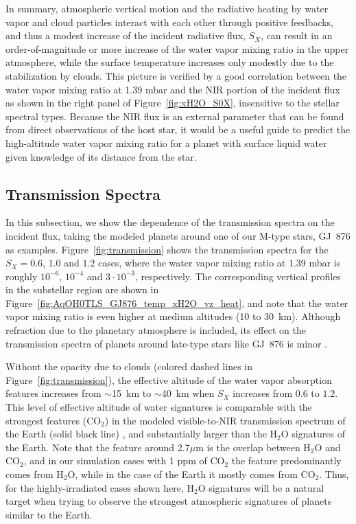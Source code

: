 \documentclass[11pt,numberedappendix,twocolappendix,]{emulateapj}
\def\water{H$_2$O}
\def\preslevel{1.39 mbar}
\def\wv{water vapor}
\begin{document}
In summary, atmospheric vertical motion and the radiative heating by \wv{} and cloud particles interact with each other through positive feedbacks, and thus a modest increase of the incident radiative flux, $S_X$, can result in  an order-of-magnitude or more increase of the \wv{} mixing ratio in the upper atmosphere, while the surface temperature increases only modestly due to the stabilization by clouds. 
This picture is verified by a good correlation between the \wv{} mixing ratio at \preslevel{} and the NIR portion of the incident flux as shown in the right panel of Figure~\ref{fig:xH2O_S0X}, insensitive to the stellar spectral types. %
Because the NIR flux is an external parameter that can be found from direct observations of the host star, it would be a useful guide to predict the high-altitude \wv{}  mixing ratio for a planet with surface liquid water given knowledge of its distance from the star. 


\subsection{Transmission Spectra}
\label{ss:result_TransmissionSpectra}


In this subsection, we show the dependence of the transmission spectra on the incident flux, taking the modeled planets around one of our M-type stars, GJ~876 as examples. 
Figure~\ref{fig:transmission} shows the transmission spectra for the $S_X=0.6$, $1.0$ and $1.2$ cases, where the \wv{} mixing ratio at \preslevel{} is roughly $10^{-6}$, $10^{-4}$ and $3\cdot 10^{-3}$, respectively. 
The corresponding vertical profiles in the substellar region are shown in Figure~\ref{fig:AqOH0TLS_GJ876_temp_xH2O_vz_heat}, and note that the \wv{} mixing ratio is even higher at medium altitudes (10 to 30~km).
Although refraction due to the planetary atmosphere is included, its effect on the transmission spectra of planets around late-type stars like GJ~876 is minor \citep{Betremieux2014,Misra2014}. 

Without the opacity due to clouds (colored dashed lines in Figure~\ref{fig:transmission}), the effective altitude of the water vapor absorption features increases from $\sim $15~km to $\sim $40~km when $S_X$ increases from $0.6$ to $1.2$. 
This level of effective altitude of water signatures is comparable with the strongest features (CO$_2$) in the modeled visible-to-NIR transmission spectrum of the Earth (solid black line) , and substantially larger than the H$_2$O signatures of the Earth. %
Note that the feature around 2.7$\mu $m is the overlap between H$_2$O and CO$_2$, and in our simulation cases with 1 ppm of CO$_2$ the feature predominantly comes from H$_2$O, while in the case of the Earth it mostly comes from CO$_2$. 
Thus, for the highly-irradiated cases shown here, \water{} signatures will be a natural target when trying to observe the strongest atmospheric signatures of planets similar to the Earth. 
\end{document}
